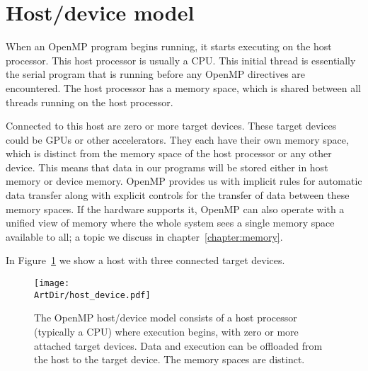 \section{Host/device model}
\label{sec:host_device_model}

When an OpenMP program begins running, it starts executing on the host processor.
This host processor is usually a CPU.
This initial thread is essentially the serial program that is running before any OpenMP directives are encountered.
The host processor has a memory space, which is shared between all threads running on the host processor.

Connected to this host are zero or more target devices. These target devices could be GPUs or other accelerators.
They each have their own memory space, which is distinct from the memory space of the host processor or any other device.
This means that data in our programs will be stored either in host memory or device memory.
OpenMP provides us with implicit rules for automatic data transfer along with explicit controls for the transfer of data between these memory spaces.
If the hardware supports it, OpenMP can also operate with a unified view of memory where the whole system sees a single 
memory space available to all; a topic we discuss in chapter~\ref{chapter:memory}.

In Figure~\ref{fig:host_device} we show a host with three connected target devices.

\begin{figure}[t]
\centerline{\texttt{[image: \\ArtDir/host\_device.pdf]}}
\caption[The OpenMP host/device model consits of a host processor (typically a CPU) where execution begins, with zero or more attached target devices.
Data and execution can be offloaded from the host to the target device.
The memory spaces are distinct.]
{The OpenMP host/device model consists of a host processor (typically a CPU) where execution begins, with zero or more attached target devices.
Data and execution can be offloaded from the host to the target device.
The memory spaces are distinct.}
\label{fig:host_device}
\end{figure}


